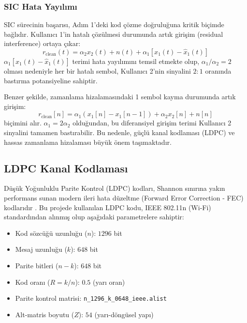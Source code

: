 \subsubsection{SIC Hata Yayılımı}
SIC sürecinin başarısı, Adım 1'deki kod çözme doğruluğuna kritik biçimde bağlıdır. Kullanıcı 1'in hatalı çözülmesi durumunda artık girişim (residual interference) ortaya çıkar:
\begin{equation}
r_{\text{clean}}(t) = \alpha_2 x_2(t) + n(t) + \alpha_1 \left[ x_1(t) - \hat{x}_1(t) \right]
\end{equation}
$\alpha_1 \left[ x_1(t) - \hat{x}_1(t) \right]$ terimi hata yayılımını temsil etmekte olup, $\alpha_1 / \alpha_2 = 2$ olması nedeniyle her bir hatalı sembol, Kullanıcı 2'nin sinyalini $2:1$ oranında bastırma potansiyeline sahiptir.

Benzer şekilde, zamanlama hizalamasındaki 1 sembol kayma durumunda artık girişim:
\begin{equation}
r_{\text{clean}}[n] = \alpha_1(x_1[n] - x_1[n-1]) + \alpha_2 x_2[n] + n[n]
\end{equation}
biçimini alır. $\alpha_1 = 2\alpha_2$ olduğundan, bu diferansiyel girişim terimi Kullanıcı 2 sinyalini tamamen bastırabilir. Bu nedenle, güçlü kanal kodlaması (LDPC) ve hassas zamanlama hizalaması büyük önem taşımaktadır.

\subsection{LDPC Kanal Kodlaması}
Düşük Yoğunluklu Parite Kontrol (LDPC) kodları, Shannon sınırına yakın performans sunan modern ileri hata düzeltme (Forward Error Correction - FEC) kodlarıdır \cite{gallager1962low, mackay1996near}. Bu projede kullanılan LDPC kodu, IEEE 802.11n (Wi-Fi) standardından alınmış olup aşağıdaki parametrelere sahiptir:
\begin{itemize}
    \item Kod sözcüğü uzunluğu ($n$): $1296$ bit
    \item Mesaj uzunluğu ($k$): $648$ bit
    \item Parite bitleri ($n - k$): $648$ bit
    \item Kod oranı ($R = k/n$): $0.5$ (yarı oran)
    \item Parite kontrol matrisi: \texttt{n\_1296\_k\_0648\_ieee.alist}
    \item Alt-matris boyutu ($Z$): $54$ (yarı-döngüsel yapı)
\end{itemize}

